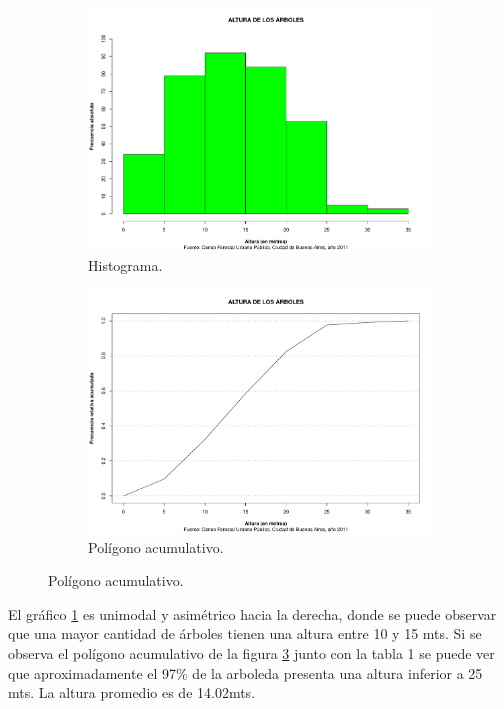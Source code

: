 \documentclass[11pt]{article}
\begin{document}
\begin{figure}[h!]
  \begin{center}
    \begin{subfigure}[b]{0.49\linewidth}
      \includegraphics[width=\linewidth]{histAltura.pdf}
      \caption{Histograma.}
      \label{fig:histAltura}
    \end{subfigure}
    \begin{subfigure}[b]{0.49\linewidth}
      \includegraphics[width=\linewidth]{acumAltura.pdf}
      \caption{Polígono acumulativo.}
      \label{fig:acumAltura}
    \end{subfigure}
  \end{center}  
\end{figure}

\begin{justify}
  El gráfico \ref{fig:histAltura} es unimodal y asimétrico hacia la derecha,
  donde se puede observar
  que una mayor cantidad de árboles tienen una altura entre 10 y 15 mts.
  Si se observa el polígono acumulativo de la figura \ref{fig:acumAltura} 
  junto con la tabla 1 se puede ver que aproximadamente el 97\% de la arboleda 
  presenta una altura inferior a 25 mts. La altura promedio es de 14.02mts.
\end{justify}
\end{document}
